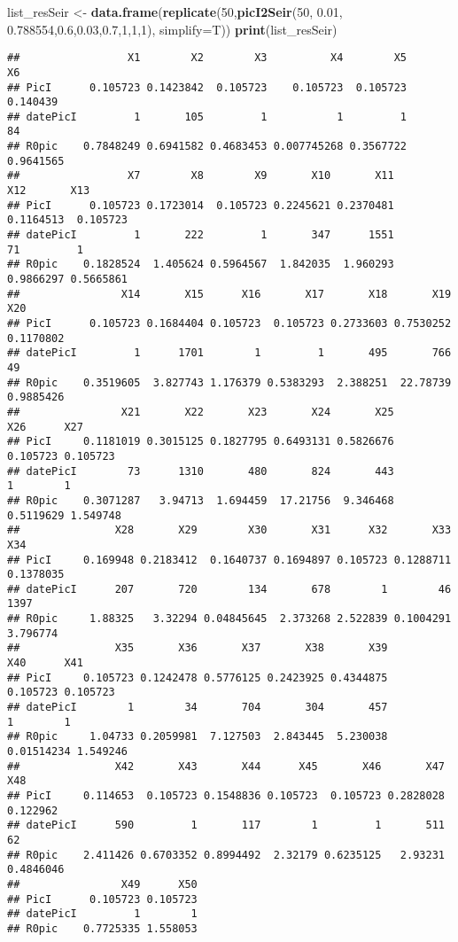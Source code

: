 \documentclass[
]{article}
\newenvironment{Shaded}{\begin{snugshade}}{\end{snugshade}}
\newcommand{\DataTypeTok}[1]{\textcolor[rgb]{0.13,0.29,0.53}{#1}}
\newcommand{\DecValTok}[1]{\textcolor[rgb]{0.00,0.00,0.81}{#1}}
\newcommand{\FloatTok}[1]{\textcolor[rgb]{0.00,0.00,0.81}{#1}}
\newcommand{\KeywordTok}[1]{\textcolor[rgb]{0.13,0.29,0.53}{\textbf{#1}}}
\newcommand{\NormalTok}[1]{#1}
\newcommand{\StringTok}[1]{\textcolor[rgb]{0.31,0.60,0.02}{#1}}
\begin{document}
\begin{Shaded}
\begin{Highlighting}[]
\NormalTok{list_resSeir <-}\StringTok{ }\KeywordTok{data.frame}\NormalTok{(}\KeywordTok{replicate}\NormalTok{(}\DecValTok{50}\NormalTok{,}\KeywordTok{picI2Seir}\NormalTok{(}\DecValTok{50}\NormalTok{, }\FloatTok{0.01}\NormalTok{, }\FloatTok{0.788554}\NormalTok{,}\FloatTok{0.6}\NormalTok{,}\FloatTok{0.03}\NormalTok{,}\FloatTok{0.7}\NormalTok{,}\DecValTok{1}\NormalTok{,}\DecValTok{1}\NormalTok{,}\DecValTok{1}\NormalTok{), }\DataTypeTok{simplify=}\NormalTok{T))}
\KeywordTok{print}\NormalTok{(list_resSeir)}
\end{Highlighting}
\end{Shaded}

\begin{verbatim}
##                 X1        X2        X3          X4        X5        X6
## PicI      0.105723 0.1423842  0.105723    0.105723  0.105723  0.140439
## datePicI         1       105         1           1         1        84
## R0pic    0.7848249 0.6941582 0.4683453 0.007745268 0.3567722 0.9641565
##                 X7        X8        X9       X10       X11       X12       X13
## PicI      0.105723 0.1723014  0.105723 0.2245621 0.2370481 0.1164513  0.105723
## datePicI         1       222         1       347      1551        71         1
## R0pic    0.1828524  1.405624 0.5964567  1.842035  1.960293 0.9866297 0.5665861
##                X14       X15      X16       X17       X18       X19       X20
## PicI      0.105723 0.1684404 0.105723  0.105723 0.2733603 0.7530252 0.1170802
## datePicI         1      1701        1         1       495       766        49
## R0pic    0.3519605  3.827743 1.176379 0.5383293  2.388251  22.78739 0.9885426
##                X21       X22       X23       X24       X25       X26      X27
## PicI     0.1181019 0.3015125 0.1827795 0.6493131 0.5826676  0.105723 0.105723
## datePicI        73      1310       480       824       443         1        1
## R0pic    0.3071287   3.94713  1.694459  17.21756  9.346468 0.5119629 1.549748
##               X28       X29        X30       X31      X32       X33       X34
## PicI     0.169948 0.2183412  0.1640737 0.1694897 0.105723 0.1288711 0.1378035
## datePicI      207       720        134       678        1        46      1397
## R0pic     1.88325   3.32294 0.04845645  2.373268 2.522839 0.1004291  3.796774
##               X35       X36       X37       X38       X39        X40      X41
## PicI     0.105723 0.1242478 0.5776125 0.2423925 0.4344875   0.105723 0.105723
## datePicI        1        34       704       304       457          1        1
## R0pic     1.04733 0.2059981  7.127503  2.843445  5.230038 0.01514234 1.549246
##               X42       X43       X44      X45       X46       X47       X48
## PicI     0.114653  0.105723 0.1548836 0.105723  0.105723 0.2828028  0.122962
## datePicI      590         1       117        1         1       511        62
## R0pic    2.411426 0.6703352 0.8994492  2.32179 0.6235125   2.93231 0.4846046
##                X49      X50
## PicI      0.105723 0.105723
## datePicI         1        1
## R0pic    0.7725335 1.558053
\end{verbatim}
\end{document}
